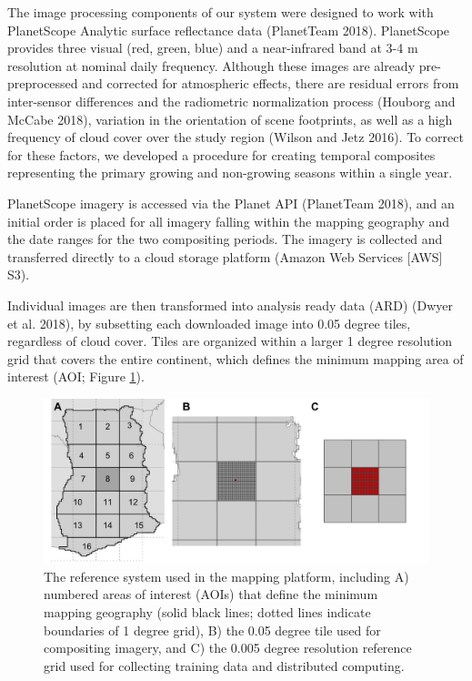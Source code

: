 \documentclass[11pt,a4paper]{article}
\begin{document}
The image processing components of our system were designed to work with
PlanetScope Analytic surface reflectance data (PlanetTeam 2018).
PlanetScope provides three visual (red, green, blue) and a near-infrared
band at 3-4 m resolution at nominal daily frequency. Although these
images are already pre-preprocessed and corrected for atmospheric
effects, there are residual errors from inter-sensor differences and the
radiometric normalization process (Houborg and McCabe 2018), variation
in the orientation of scene footprints, as well as a high frequency of
cloud cover over the study region (Wilson and Jetz 2016). To correct for
these factors, we developed a procedure for creating temporal composites
representing the primary growing and non-growing seasons within a single
year.

PlanetScope imagery is accessed via the Planet API (PlanetTeam 2018),
and an initial order is placed for all imagery falling within the
mapping geography and the date ranges for the two compositing periods.
The imagery is collected and transferred directly to a cloud storage
platform (Amazon Web Services {[}AWS{]} S3).

Individual images are then transformed into analysis ready data (ARD)
(Dwyer et al. 2018), by subsetting each downloaded image into 0.05
degree tiles, regardless of cloud cover. Tiles are organized within a
larger 1 degree resolution grid that covers the entire continent, which
defines the minimum mapping area of interest (AOI; Figure
\ref{fig:aois}).

\begin{figure}

{\centering \includegraphics[width=1\linewidth]{figures/figure2} 

}

\caption{The reference system used in the mapping platform, including A) numbered areas of interest (AOIs) that define the minimum mapping geography (solid black lines; dotted lines indicate boundaries of 1 degree grid), B) the 0.05 degree tile used for compositing imagery, and C) the 0.005 degree resolution reference grid used for collecting training data and distributed computing.}\label{fig:aois}
\end{figure}
\end{document}
